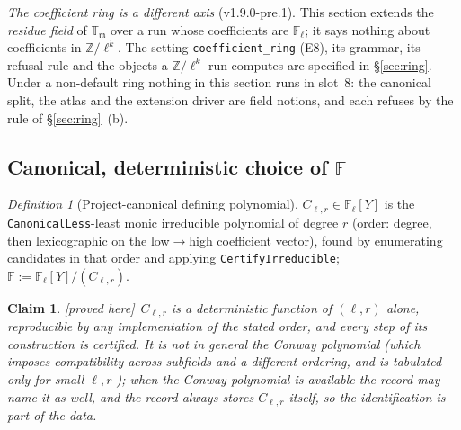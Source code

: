 \documentclass[11pt]{article}
\newtheorem{claim}[theorem]{Claim}
\theoremstyle{remark}
\newtheorem{definition}[theorem]{Definition}
\newcommand{\F}{\mathbb{F}}
\newcommand{\Z}{\mathbb{Z}}
\newcommand{\Fl}{\F_\ell}
\newcommand{\T}{\mathbb{T}}
\newcommand{\m}{\mathfrak{m}}
\newcommand{\PROVED}{\textsf{[proved here]}}
\begin{document}
\noindent\emph{The coefficient ring is a different axis} (v1.9.0-pre.1). This section extends the
\emph{residue field} of $\T_\m$ over a run whose coefficients are $\Fl$; it says nothing about
coefficients in $\Z/\ell^k$. The setting \texttt{coefficient\_ring} (E8), its grammar, its refusal
rule and the objects a $\Z/\ell^k$ run computes are specified in \S\ref{sec:ring}. Under a
non-default ring nothing in this section runs in slot~8: the canonical split, the atlas and the
extension driver are field notions, and each refuses by the rule of \S\ref{sec:ring}~(b).

\subsection{Canonical, deterministic choice of \texorpdfstring{$\F$}{F}}\label{sec:canon}
\begin{definition}[Project-canonical defining polynomial]\label{def:canon}
$C_{\ell,r}\in\Fl[Y]$ is the \texttt{CanonicalLess}-least monic irreducible polynomial of
degree $r$ (order: degree, then lexicographic on the low$\to$high coefficient vector),
found by enumerating candidates in that order and applying \texttt{CertifyIrreducible};
$\F:=\Fl[Y]/(C_{\ell,r})$.
\end{definition}
\begin{claim}\label{cl:canon}\PROVED\
$C_{\ell,r}$ is a deterministic function of $(\ell,r)$ alone, reproducible by any
implementation of the stated order, and every step of its construction is certified. It is
\emph{not} in general the Conway polynomial (which imposes compatibility across subfields
and a different ordering, and is tabulated only for small $\ell,r$ \cite{lubeck}); when the
Conway polynomial is available the record may name it as well, and the record always stores
$C_{\ell,r}$ itself, so the identification is part of the data.
\end{claim}
\end{document}
